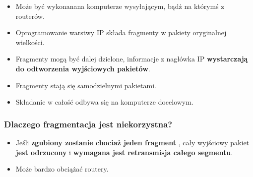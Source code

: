 \documentclass[../sk-egzamin.tex]{subfiles}
\begin{document}
\begin{itemize}
    \item Może być wykonanana komputerze wysyłającym, bądż na którymś z
    routerów.
    \item Oprogramowanie warstwy IP składa fragmenty w pakiety oryginalnej
    wielkości.
    \item Fragmenty mogą być dalej dzielone, informacje z nagłówka IP
    \textbf{wystarczają do odtworzenia wyjściowych pakietów}.
    \item Fragmenty stają się samodzielnymi pakietami.
    \item Składanie w całość odbywa się na komputerze docelowym.
\end{itemize}

\subsubsection*{Dlaczego fragmentacja jest niekorzystna?}
\begin{itemize}
    \item
Jeśli \textbf{zgubiony zostanie chociaż jeden fragment}
,
cały wyjściowy pakiet \textbf{jest odrzucony}
i \textbf{wymagana jest retransmisja całego segmentu}.
\item Może bardzo obciążać routery.
\end{itemize}

\pagebreak
\end{document}
